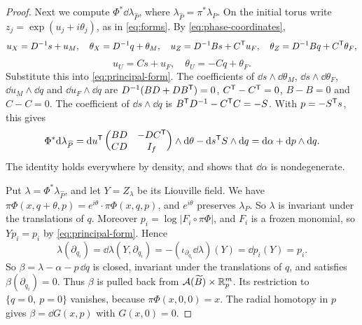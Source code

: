 \documentclass[12pt, letter]{amsart}
\theoremstyle{definition}
\begin{document}
\begin{proof}
Next we compute $\Phi^*\dd\lambda_{\widehat P}$, where $\lambda_{\widehat P}=\pi^*\lambda_P$.
On the initial torus write $z_j=\exp(u_j+i\theta_j)$, as in \eqref{eq:forms}.
By \eqref{eq:phase-coordinates},
\[
 u_X=D^{-1}s+u_M,\quad \theta_X=D^{-1}q+\theta_M,\quad
 u_Z=D^{-1}Bs+C^{\mathsf T}u_F,\quad \theta_Z=D^{-1}Bq+C^{\mathsf T}\theta_F,\]\[
 u_U=Cs+u_F,\quad \theta_U=-Cq+\theta_F .
\]
Substitute this into \eqref{eq:principal-form}.
The coefficients of $\dd s\wedge \dd\theta_M$, $\dd s\wedge \dd\theta_F$, $\dd u_M\wedge \dd q$ and $\dd u_F\wedge \dd q$ are $D^{-1}(BD+DB^{\mathsf T})=0$, $C^{\mathsf T}-C^{\mathsf T}=0$, $B-B=0$ and $C-C=0$.
The coefficient of $\dd s\wedge \dd q$ is $B^{\mathsf T}D^{-1}-C^{\mathsf T}C=-S$.
With $p=-S^{\mathsf T}s$, this gives
\[
 \Phi^*\mathrm{d}\lambda_{\widehat P}=\mathrm{d} u^{\mathsf T}\begin{pmatrix}BD&-DC^{\mathsf T}\\CD&I_f\end{pmatrix}\wedge \mathrm{d}\theta-\mathrm{d} s^{\mathsf T}S\wedge \mathrm{d} q=\mathrm{d}\alpha+\mathrm{d} p\wedge \mathrm{d} q .
\]
The identity holds everywhere by density, and shows that $\dd\alpha$ is nondegenerate.

Put $\lambda=\Phi^*\lambda_{\widehat P}$, and let $Y=Z_\lambda$ be its Liouville field.
We have $\pi\Phi(x,q+\theta,p)=e^{i\theta}\cdot\pi\Phi(x,q,p)$, and $e^{i\theta}$ preserves $\lambda_P$.
So $\lambda$ is invariant under the translations of $q$.
Moreover $p_i=\log|F_i\circ\pi\Phi|$, and $F_i$ is a frozen monomial, so $Yp_i=p_i$ by \eqref{eq:principal-form}.
Hence
\[
 \lambda(\partial_{q_i})=\dd\lambda(Y,\partial_{q_i})=-(\iota_{\partial_{q_i}}\dd\lambda)(Y)=\dd p_i(Y)=p_i .
\]
So $\beta=\lambda-\alpha-p\,\dd q$ is closed, invariant under the translations of $q$, and satisfies $\beta(\partial_{q_i})=0$.
Thus $\beta$ is pulled back from $\mathcal{A}(\widetilde B)\times\mathbb{R}^m_p$.
Its restriction to $\{q=0,\ p=0\}$ vanishes, because $\pi\Phi(x,0,0)=x$.
The radial homotopy in $p$ gives $\beta=\dd G(x,p)$ with $G(x,0)=0$.


\end{proof}
\end{document}

